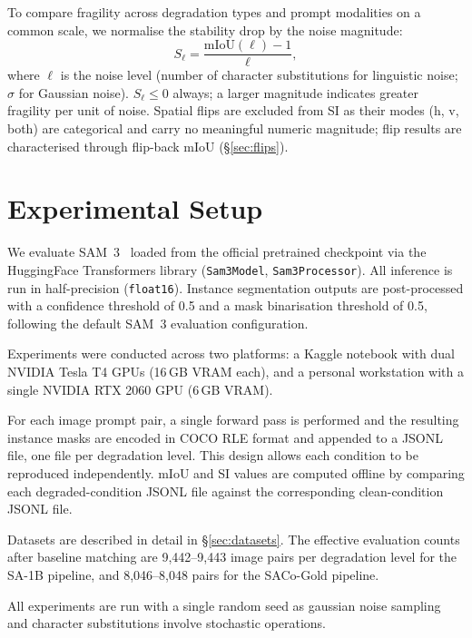 \documentclass[10pt,twocolumn,letterpaper]{article}
\begin{document}

To compare fragility across degradation types and prompt modalities on a common scale, we normalise the stability drop by the noise magnitude:
  \begin{equation}
    S_\ell = \frac{\mathrm{mIoU}(\ell) - 1}{\ell},
    \label{eq:si}  \end{equation}
  where $\ell$ is the noise level (number of character substitutions for linguistic noise; $\sigma$ for Gaussian noise). $S_\ell \leq 0$ always; a larger magnitude indicates greater fragility per unit of noise. Spatial flips are excluded from SI as their modes (h, v, both) are
  categorical and carry no meaningful numeric magnitude; flip results are
  characterised through flip-back mIoU (\S\ref{sec:flips}).
\section{Experimental Setup}
\label{sec:expSetup}
We evaluate SAM~3~\cite{peng2025sam3} loaded from the official pretrained checkpoint via the HuggingFace Transformers library (\texttt{Sam3Model},
\texttt{Sam3Processor}). All inference is run in half-precision (\texttt{float16}). Instance segmentation outputs are post-processed with a confidence threshold of 0.5 and a mask binarisation threshold of 0.5,
following the default SAM~3 evaluation configuration.


Experiments were conducted across two platforms: a Kaggle notebook with dual NVIDIA Tesla T4 GPUs (16\,GB VRAM each), and a personal workstation with a
single NVIDIA RTX 2060 GPU (6\,GB VRAM).


For each image prompt pair, a single forward pass is performed and the resulting instance masks are encoded in COCO RLE format and appended to a JSONL
file, one file per degradation level. This design allows each condition to be reproduced independently. mIoU and SI values are computed offline
by comparing each degraded-condition JSONL file against the corresponding clean-condition JSONL file.


Datasets are described in detail in \S\ref{sec:datasets}. The effective
evaluation counts after baseline matching are 9,442--9,443 image pairs per degradation level for the SA-1B pipeline, and 8,046--8,048 pairs for the SACo-Gold pipeline.


All experiments are run with a single random seed as gaussian noise sampling and character substitutions involve stochastic operations. 
\end{document}
